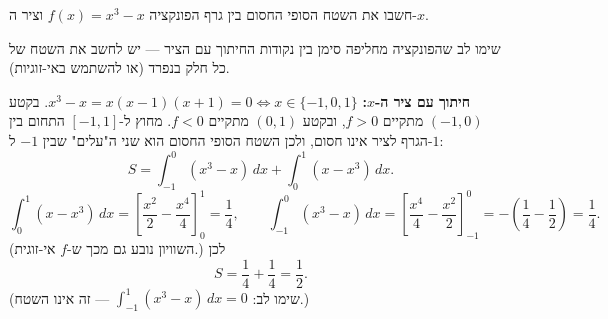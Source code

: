 
\begin{question}
חשבו את השטח הסופי החסום בין גרף הפונקציה $f(x)=x^3-x$ וציר ה-$x$.
\end{question}

\begin{hint}
שימו לב שהפונקציה מחליפה סימן בין נקודות החיתוך עם הציר — יש לחשב את השטח של כל חלק בנפרד (או להשתמש באי-זוגיות).
\end{hint}

\begin{solution}
\textbf{חיתוך עם ציר ה-$x$:} $x^3-x=x(x-1)(x+1)=0\iff x\in\{-1,0,1\}$.
בקטע $(-1,0)$ מתקיים $f>0$, ובקטע $(0,1)$ מתקיים $f<0$. מחוץ ל-$[-1,1]$ התחום בין הגרף לציר אינו חסום, ולכן השטח הסופי החסום הוא שני ה"עלים" שבין $-1$ ל-$1$:
\[ S=\int_{-1}^0(x^3-x)\,dx+\int_0^1(x-x^3)\,dx. \]
\[ \int_0^1(x-x^3)\,dx=\left[\frac{x^2}{2}-\frac{x^4}{4}\right]_0^1=\frac14,\qquad \int_{-1}^0(x^3-x)\,dx=\left[\frac{x^4}{4}-\frac{x^2}{2}\right]_{-1}^0=-\left(\frac14-\frac12\right)=\frac14. \]
(השוויון נובע גם מכך ש-$f$ אי-זוגית.) לכן
\[ S=\frac14+\frac14=\boxed{\frac12}. \]
(שימו לב: $\int_{-1}^1(x^3-x)\,dx=0$ — זה אינו השטח.)
\end{solution}
